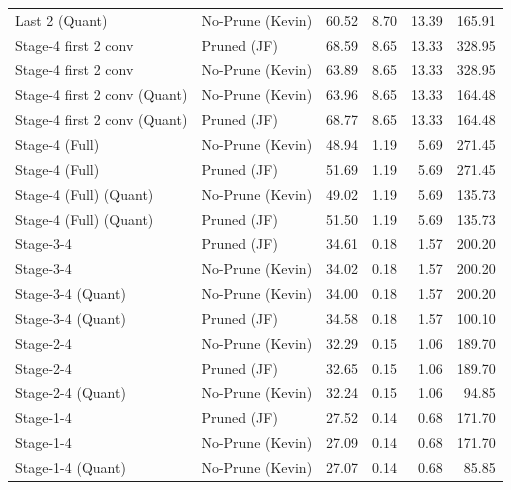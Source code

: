 \begin{table}
\begin{tabular}{llrrrr}
Last 2
(Quant) & No-Prune (Kevin) & 60.52 & 8.70 & 13.39 & 165.91 \\
Stage-4 first 2 conv & Pruned (JF) & 68.59 & 8.65 & 13.33 & 328.95 \\
Stage-4 first 2 conv & No-Prune (Kevin) & 63.89 & 8.65 & 13.33 & 328.95 \\
Stage-4 first 2 conv
(Quant) & No-Prune (Kevin) & 63.96 & 8.65 & 13.33 & 164.48 \\
Stage-4 first 2 conv
(Quant) & Pruned (JF) & 68.77 & 8.65 & 13.33 & 164.48 \\
Stage-4 (Full) & No-Prune (Kevin) & 48.94 & 1.19 & 5.69 & 271.45 \\
Stage-4 (Full) & Pruned (JF) & 51.69 & 1.19 & 5.69 & 271.45 \\
Stage-4 (Full)
(Quant) & No-Prune (Kevin) & 49.02 & 1.19 & 5.69 & 135.73 \\
Stage-4 (Full)
(Quant) & Pruned (JF) & 51.50 & 1.19 & 5.69 & 135.73 \\
Stage-3-4 & Pruned (JF) & 34.61 & 0.18 & 1.57 & 200.20 \\
Stage-3-4 & No-Prune (Kevin) & 34.02 & 0.18 & 1.57 & 200.20 \\
Stage-3-4
(Quant) & No-Prune (Kevin) & 34.00 & 0.18 & 1.57 & 200.20 \\
Stage-3-4
(Quant) & Pruned (JF) & 34.58 & 0.18 & 1.57 & 100.10 \\
Stage-2-4 & No-Prune (Kevin) & 32.29 & 0.15 & 1.06 & 189.70 \\
Stage-2-4 & Pruned (JF) & 32.65 & 0.15 & 1.06 & 189.70 \\
Stage-2-4
(Quant) & No-Prune (Kevin) & 32.24 & 0.15 & 1.06 & 94.85 \\
Stage-1-4 & Pruned (JF) & 27.52 & 0.14 & 0.68 & 171.70 \\
Stage-1-4 & No-Prune (Kevin) & 27.09 & 0.14 & 0.68 & 171.70 \\
Stage-1-4
(Quant) & No-Prune (Kevin) & 27.07 & 0.14 & 0.68 & 85.85 \\
\bottomrule
\end{tabular}
\end{table}
